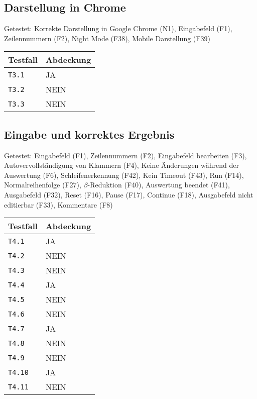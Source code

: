 \documentclass[parskip=full,11pt,twoside]{scrartcl}
\begin{document}
\subsection{Darstellung in Chrome}
    Getestet:
    Korrekte Darstellung in Google Chrome (N1),
    Eingabefeld (F1),
    Zeilennummern (F2),
    Night Mode (F38),
    Mobile Darstellung (F39)
    
    \label{shortcuts}
    \begin{center}
        \begin{tabular}{ p{9cm} p{4cm}}
            Testfall & Abdeckung \\ \hline
            \texttt{T3.1} & \cellcolor{green!20}JA \\ \hline
            \texttt{T3.2} & \cellcolor{red!20}NEIN \\ \hline
            \texttt{T3.3} & \cellcolor{red!20}NEIN \\ \hline
        \end{tabular}
    \end{center}

\subsection{Eingabe und korrektes Ergebnis}
    Getestet:
    Eingabefeld (F1),
    Zeilennummern (F2),
    Eingabefeld bearbeiten (F3),
    Autovervollständigung von Klammern (F4),
    Keine Änderungen während der Auswertung (F6),
    Schleifenerkennung (F42),
    Kein Timeout (F43),
    Run (F14),
    Normalreihenfolge (F27),
    $\beta$-Reduktion (F40),
    Auswertung beendet (F41),
    Ausgabefeld (F32),
    Reset (F16),
    Pause (F17),
    Continue (F18),
    Ausgabefeld nicht editierbar (F33),
    Kommentare (F8)

    \label{shortcuts}
    \begin{center}
        \begin{tabular}{ p{9cm} p{4cm}}
            Testfall & Abdeckung \\ \hline
            \texttt{T4.1} & \cellcolor{green!20}JA \\ \hline
            \texttt{T4.2} & \cellcolor{red!20}NEIN \\ \hline
            \texttt{T4.3} & \cellcolor{red!20}NEIN \\ \hline
            \texttt{T4.4} & \cellcolor{green!20}JA \\ \hline
            \texttt{T4.5} & \cellcolor{red!20}NEIN \\ \hline
            \texttt{T4.6} & \cellcolor{red!20}NEIN \\ \hline
            \texttt{T4.7} & \cellcolor{green!20}JA \\ \hline
            \texttt{T4.8} & \cellcolor{red!20}NEIN \\ \hline
            \texttt{T4.9} & \cellcolor{red!20}NEIN \\ \hline
            \texttt{T4.10} & \cellcolor{green!20}JA \\ \hline
            \texttt{T4.11} & \cellcolor{red!20}NEIN \\ \hline
        \end{tabular}
    \end{center}
\end{document}

